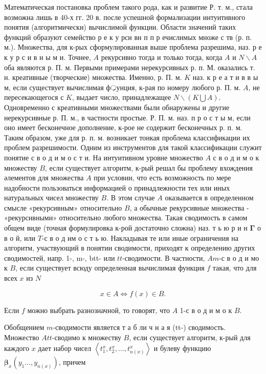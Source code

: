 \documentclass[10pt]{article}
\begin{document}
Математическая постановка проблем такого рода, как и развитие Р. т. м., стала возможна лишь в 40-х гг. 20 в. после успешной формализации интуитивного понятия (алгоритмически) вычислимой функции. Области значений таких функций образуют семейство р е к у рси вн п п р ечислимых множе с тв (р. п. м.). Множества, для к-рых сформулированная выше проблема разрешима, наз. р е к у р с и в н ы м и. Точнее, $A$ рекурсивно тогда и только тогда, когда $A$ и $N \backslash A$ оба являются р. П. м. Первыми примерами нерекурсивных р. п. М. оказались т. н. креативные (творческие) множества. Именно, р. П. м. $K$ наз. к р е а т и в в ы м, если существует вычислимая ф्रунция, к-рая по номеру любого р. П. м. $A$, не пересекающегося с $K$, выдает число, принадлежащее $N \backslash(K \bigcup A)$. Одновременно с креативными множествами были обнаружены и другие нерекурсивные р. П. м., в частности простые. Р. П. м. наз. п р о с т ы м, если оно имеет бесконечное дополнение, к-рое не содержит бесконечных р. п. м. Таким образом, уже для р. п. м. возникает тонкая проблема классификации их проблем разрешимости. Одним из инструментов для такой классификации служит понятие с в о д и м о с т и. На интуитивном уровне множество $A$ с в о д и м о к множеству $B$, если существует алгоритм, к-рый решал бы проблему вхождения әлементов для множества $A$ при условии, что есть возможность по мере надобности пользоваться информацией о принадлежности тех или иных натуральных чисел множеству $B$. В этом случае $A$ оказывается в определенном смысле «рекурсивным» относительно $B$, а обычные рекурсивные множества - «рекурсивными» относительно любого множества. Такая сводимость в самом общем виде (точная формулировка к-рой достаточно сложна) наз. т ь ю р и н $\boldsymbol{\Gamma}$ о в о й, или $T$-с в о д им о с т ь ю. Накладывая те или иные ограничения на алгоритм, участвующий в понятии сводимости, приходят к определению других сводимостей, напр. 1-, m-, btt- или $t t$-сводимости. В частности, $A m$-с в о д и мо к $B$, если существует всюду определенная вычислимая функция $f$ такая, что для всех $x$ из $N$



\[

x \in A \Leftrightarrow f(x) \in B .

\]



Если $f$ можно выбрать разнозначной, то говорят, что $A$ 1-с в о д и м о к $B$.



Обобщением $m$-сводимости является т а б ли ч н а я (tt-) сводимость. Множество $A t t$-сводимо к множеству $B$, если существует алгоритм, к-рый для каждого $x$ дает набор чисел $\left\langle t_{1}^{x}, t_{2}^{x}, \ldots, t_{n(x)}^{x}\right\rangle$ и булеву функцию $\boldsymbol{\beta}_{x}\left(y_{1} \ldots, y_{n(x)}\right)$, причем
\end{document}
